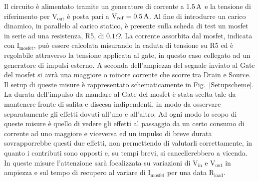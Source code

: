 Il circuito è alimentato tramite un generatore di corrente a $1.5 \rm \, A$ e la tensione di riferimento per $\mathrm{V_{out}}$ è posta pari a $\mathrm{V_{ref}=0.5 \rm \, A}$.%
Al fine di introdurre un carico dinamico, in parallelo al carico statico, è presente sulla scheda di test un mosfet in serie ad una resistenza, R5, di $0.1 \Omega$.
La corrente assorbita dal mosfet, indicata con $\mathrm{I_{mosfet}}$, può essere calcolata misurando la caduta di tensione su R5 ed è regolabile attraverso la tensione applicata al gate, in questo caso collegato ad un generatore di impulsi esterno.
A seconda dell'ampiezza del segnale inviato al Gate del mosfet si avrà una maggiore o minore corrente che scorre tra Drain e Source. 
Il setup di queste misure è rappresentato schematicamente in Fig.~\ref{Setupscheme}.
La durata dell'impulso da mandare al Gate del mosfet è stata scelta tale da mantenere fronte di salita e discesa indipendenti, in modo da osservare separatamente gli effetti dovuti all'uno e all'altro.
Ad ogni modo lo scopo di queste misure è quello di vedere gli effetti al passaggio da un certo consumo di corrente ad uno maggiore e viceversa ed un impulso di breve durata sovrapporrebbe questi due effetti, non permettendo di valutarli correttamente, in quanto i contributi sono opposti e, su tempi brevi, si cancellerebbero a vicenda.
In queste misure l'attenzione sarà focalizzata su variazioni di $\mathrm{V_{in}}$ e $\mathrm{V_{out}}$ in ampiezza e sul tempo di recupero al variare di $\mathrm{I_{mosfet}}$ per una data $\mathrm{R_{load}}$.

